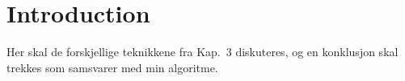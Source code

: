 
\section{Introduction}
\label{algo:intro}

Her skal de forskjellige teknikkene fra Kap.\ 3 diskuteres, og en
konklusjon skal trekkes som samsvarer med min algoritme.
